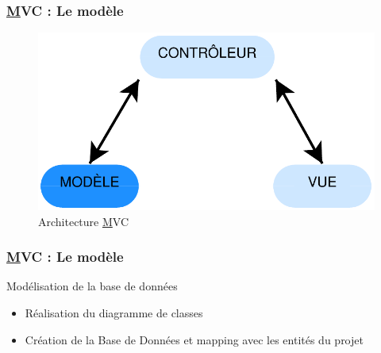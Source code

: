 \speaker{\Michel}

\begin{frame}
\frametitle{\underline{M}VC : Le modèle}
\begin{figure}[!h]
	\begin{center}
	\includegraphics[scale=0.5]{images/mvcModele}
	\caption{Architecture \underline{M}VC}
	\end{center}
\end{figure}
\end{frame}


\begin{frame}
	\frametitle{\underline{M}VC : Le modèle}
	\begin{block}{Modélisation de la base de données}	
		\begin{itemize}
			\item Réalisation du diagramme de classes
			\item Création de la Base de Données et mapping avec les entités du projet
		\end{itemize}
	\end{block}
\end{frame}


